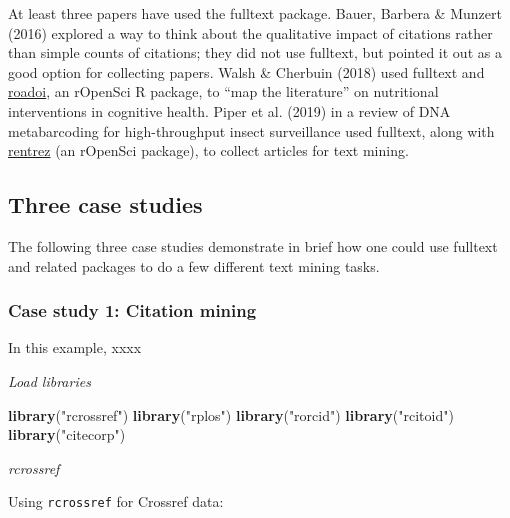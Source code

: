 \documentclass[author-year, review, 11pt]{components/elsarticle} %
\newenvironment{Shaded}{\begin{snugshade}}{\end{snugshade}}
\newcommand{\KeywordTok}[1]{\textcolor[rgb]{0.13,0.29,0.53}{\textbf{#1}}}
\newcommand{\NormalTok}[1]{#1}
\newcommand{\StringTok}[1]{\textcolor[rgb]{0.31,0.60,0.02}{#1}}
\begin{document}
At least three papers have used the fulltext package. Bauer, Barbera \&
Munzert (2016) explored a way to think about the qualitative impact of
citations rather than simple counts of citations; they did not use
fulltext, but pointed it out as a good option for collecting papers.
Walsh \& Cherbuin (2018) used fulltext and
\href{https://github.com/ropensci/roadoi}{roadoi}, an rOpenSci R
package, to ``map the literature'' on nutritional interventions in
cognitive health. Piper et al. (2019) in a review of DNA metabarcoding
for high-throughput insect surveillance used fulltext, along with
\href{https://github.com/ropensci/rentrez}{rentrez} (an rOpenSci
package), to collect articles for text mining.

\hypertarget{three-case-studies}{%
\subsection{Three case studies}\label{three-case-studies}}

The following three case studies demonstrate in brief how one could use
fulltext and related packages to do a few different text mining tasks.

\hypertarget{case-study-1-citation-mining}{%
\subsubsection{Case study 1: Citation
mining}\label{case-study-1-citation-mining}}

In this example, xxxx

\emph{Load libraries}

\begin{Shaded}
\begin{Highlighting}[]
\KeywordTok{library}\NormalTok{(}\StringTok{"rcrossref"}\NormalTok{)}
\KeywordTok{library}\NormalTok{(}\StringTok{"rplos"}\NormalTok{)}
\KeywordTok{library}\NormalTok{(}\StringTok{"rorcid"}\NormalTok{)}
\KeywordTok{library}\NormalTok{(}\StringTok{"rcitoid"}\NormalTok{)}
\KeywordTok{library}\NormalTok{(}\StringTok{"citecorp"}\NormalTok{)}
\end{Highlighting}
\end{Shaded}

\emph{rcrossref}

Using \texttt{rcrossref} for Crossref data:
\end{document}
